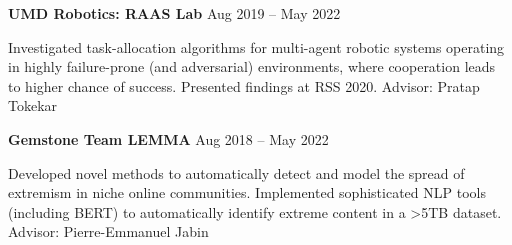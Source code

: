 \documentclass[letterpaper,11pt]{article}
\begin{document}
\begin{minipage}[t]{0.42\textwidth}
  \noindent
  \textbf{UMD Robotics: RAAS Lab} \hspace{\fill} Aug 2019 -- May 2022

  \setlength{\parindent}{15pt}
  {\small Investigated task-allocation algorithms for multi-agent robotic systems operating in highly failure-prone (and adversarial) environments, where cooperation leads to higher chance of success. Presented findings at RSS 2020. Advisor: Pratap Tokekar}

  \vspace*{6pt}

  \noindent
  \textbf{Gemstone Team LEMMA} \hspace{\fill} Aug 2018 -- May 2022
    
  \setlength{\parindent}{15pt}
  {\small Developed novel methods to automatically detect and model the spread of extremism in niche online communities. Implemented sophisticated NLP tools (including BERT) to automatically identify extreme content in a >5TB dataset. Advisor: Pierre-Emmanuel Jabin}
\end{minipage}


\end{document}
